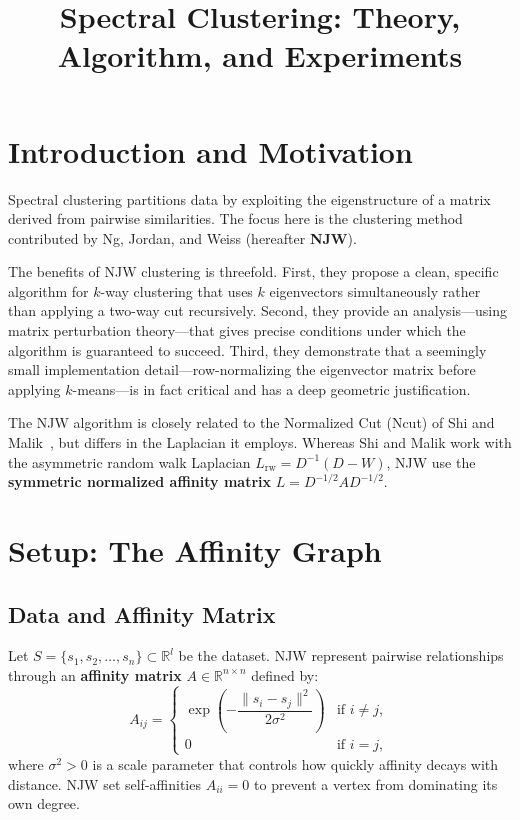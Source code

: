 \documentclass[11pt]{article}
\title{Spectral Clustering: Theory, Algorithm, and Experiments}
\author{}
\date{}
\theoremstyle{plain}
\theoremstyle{definition}
\begin{document}
\maketitle

\section{Introduction and Motivation}

Spectral clustering partitions data by exploiting the eigenstructure of a matrix derived from pairwise similarities. The focus here is the clustering method contributed by Ng, Jordan, and Weiss (hereafter \textbf{NJW}).

\noindent 
The benefits of NJW clustering is threefold. First, they propose a clean, specific algorithm for $k$-way clustering that uses $k$ eigenvectors simultaneously rather than applying a two-way cut recursively. Second, they provide an analysis---using matrix perturbation theory---that gives precise conditions under which the algorithm is guaranteed to succeed. Third, they demonstrate that a seemingly small implementation detail---row-normalizing the eigenvector matrix before applying $k$-means---is in fact critical and has a deep geometric justification.


The NJW algorithm is closely related to the Normalized Cut (Ncut) of Shi and Malik~\cite{ShiMalik2000}, but differs in the Laplacian it employs. Whereas Shi and Malik work with the asymmetric random walk Laplacian $L_{\mathrm{rw}} = D^{-1}(D-W)$, NJW use the \textbf{symmetric normalized affinity matrix} $L = D^{-1/2}AD^{-1/2}$.

\section{Setup: The Affinity Graph}

\subsection{Data and Affinity Matrix}

Let $S = \{s_1, s_2, \ldots, s_n\} \subset \mathbb{R}^l$ be the dataset. NJW represent pairwise relationships through an \textbf{affinity matrix} $A \in \mathbb{R}^{n \times n}$ defined by:
\begin{equation}
    A_{ij} =
    \begin{cases}
        \exp\!\left(-\dfrac{\|s_i - s_j\|^2}{2\sigma^2}\right) & \text{if } i \neq j, \\[6pt]
        0 & \text{if } i = j,
    \end{cases}
    \label{eq:affinity}
\end{equation}
where $\sigma^2 > 0$ is a scale parameter that controls how quickly affinity decays with distance. NJW set self-affinities $A_{ii} = 0$ to prevent a vertex from dominating its own degree.
\end{document}
